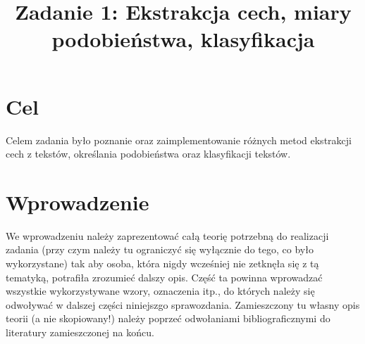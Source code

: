 \documentclass{classrep}
\author{
  \studentinfo{Stanisław Zakrzewski}{210360} \and
  \studentinfo{ Maciej Socha}{210321}
}
\title{Zadanie 1: Ekstrakcja cech, miary podobieństwa, klasyfikacja}
\begin{document}
\maketitle

\section{Cel}
Celem zadania było poznanie oraz zaimplementowanie różnych metod ekstrakcji cech z tekstów, określania podobieństwa oraz klasyfikacji tekstów.

\section{Wprowadzenie}
{\color{blue}
We wprowadzeniu należy zaprezentować całą teorię potrzebną do realizacji
zadania (przy czym należy tu ograniczyć się wyłącznie do tego, co było
wykorzystane) tak aby osoba, która nigdy wcześniej nie zetknęła się z tą
tematyką, potrafiła zrozumieć dalszy opis. Część ta powinna wprowadzać
wszystkie wykorzystywane wzory, oznaczenia itp., do których należy się
odwoływać w dalszej części niniejszgo sprawozdania. Zamieszczony tu własny
opis teorii (a nie skopiowany!) należy poprzeć odwołaniami bibliograficznymi
do literatury zamieszczonej na końcu. }
\end{document}
